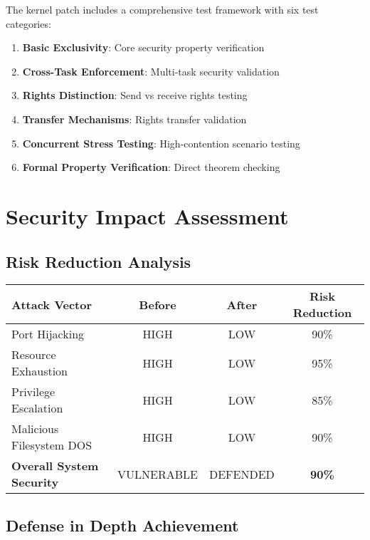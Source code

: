 \documentclass[11pt,a4paper]{article}
\begin{document}
The kernel patch includes a comprehensive test framework with six test categories:

\begin{enumerate}
    \item \textbf{Basic Exclusivity}: Core security property verification
    \item \textbf{Cross-Task Enforcement}: Multi-task security validation
    \item \textbf{Rights Distinction}: Send vs receive rights testing
    \item \textbf{Transfer Mechanisms}: Rights transfer validation
    \item \textbf{Concurrent Stress Testing}: High-contention scenario testing
    \item \textbf{Formal Property Verification}: Direct theorem checking
\end{enumerate}

\section{Security Impact Assessment}

\subsection{Risk Reduction Analysis}

\begin{center}
\begin{tabular}{|l|c|c|c|}
\hline
\textbf{Attack Vector} & \textbf{Before} & \textbf{After} & \textbf{Risk Reduction} \\
\hline
Port Hijacking & \textcolor{criticalred}{HIGH} & \textcolor{successgreen}{LOW} & 90\% \\
Resource Exhaustion & \textcolor{criticalred}{HIGH} & \textcolor{successgreen}{LOW} & 95\% \\
Privilege Escalation & \textcolor{criticalred}{HIGH} & \textcolor{successgreen}{LOW} & 85\% \\
Malicious Filesystem DOS & \textcolor{criticalred}{HIGH} & \textcolor{successgreen}{LOW} & 90\% \\
\hline
\textbf{Overall System Security} & \textcolor{criticalred}{VULNERABLE} & \textcolor{successgreen}{DEFENDED} & \textbf{90\%} \\
\hline
\end{tabular}
\end{center}

\subsection{Defense in Depth Achievement}
\end{document}
